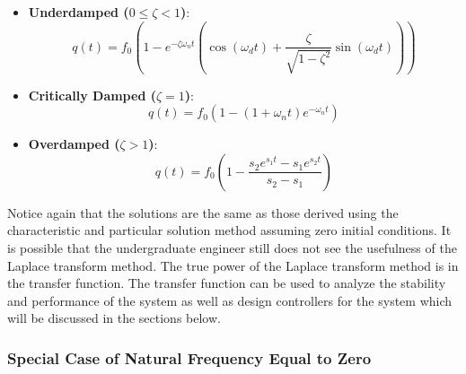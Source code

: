 \begin{itemize}
    \item {\bf Underdamped ($0 \leq \zeta<1$)}:
    \begin{equation}
        q(t) = f_0 \left( 1 - e^{-\zeta \omega_n t} \left( \cos(\omega_d t) + \frac{\zeta}{\sqrt{1-\zeta^2}} \sin(\omega_d t) \right) \right)
    \end{equation}
    \item {\bf Critically Damped ($\zeta=1$)}:
    \begin{equation}
        q(t) = f_0 \left( 1 - (1 + \omega_n t) e^{-\omega_n t} \right)
    \end{equation}
    \item {\bf Overdamped ($\zeta>1$)}:
    \begin{equation}
        q(t) = f_0 \left( 1 - \frac{s_2 e^{s_1 t} - s_1 e^{s_2 t}}{s_2 - s_1} \right)
    \end{equation}
\end{itemize}
Notice again that the solutions are the same as those derived using the characteristic and particular solution method assuming zero initial conditions. It is possible that the undergraduate engineer still does not see the usefulness of the Laplace transform method. The true power of the Laplace transform method is in the transfer function. The transfer function can be used to analyze the stability and performance of the system as well as design controllers for the system which will be discussed in the sections below.

\subsubsection{Special Case of Natural Frequency Equal to Zero}

